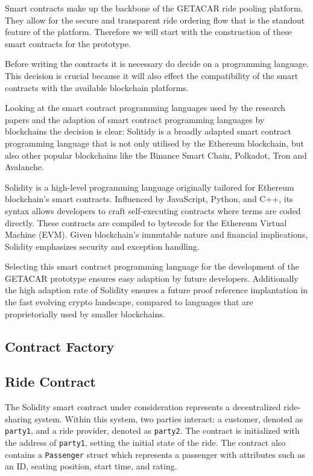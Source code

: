 Smart contracts make up the backbone of the GETACAR ride pooling platform. They allow for the secure and transparent ride ordering flow that is the standout feature of the platform. Therefore we will start with the construction of these smart contracts for the prototype. 

Before writing the contracts it is necessary do decide on a programming language. This decision is crucial because it will also effect the compatibility of the smart contracts with the available blockchain platforms. 

Looking at the smart contract programming languages used by the research papers and the adaption of smart contract programming languages by blockchains the decision is clear: Solitidy is a broadly adapted smart contract programming language that is not only utilised by the Ethereum blockchain, but also other popular blockchains like the Binance Smart Chain, Polkadot, Tron and Avalanche. 

Solidity is a high-level programming language originally tailored for Ethereum blockchain's smart contracts. Influenced by JavaScript, Python, and C++, its syntax allows developers to craft self-executing contracts where terms are coded directly. These contracts are compiled to bytecode for the Ethereum Virtual Machine (EVM). Given blockchain's immutable nature and financial implications, Solidity emphasizes security and exception handling. 

Selecting this smart contract programming language for the development of the GETACAR prototype ensures easy adaption 
by future developers. Additionally the high adaption rate of Solidity ensures a future proof reference implantation in the fast evolving crypto landscape, compared to languages that are proprietorially used by smaller blockchains. 

\subsection{Contract Factory}

\subsection{Ride Contract}


The Solidity smart contract under consideration represents a decentralized ride-sharing system. Within this system, two parties interact: a customer, denoted as \texttt{party1}, and a ride provider, denoted as \texttt{party2}. The contract is initialized with the address of \texttt{party1}, setting the initial state of the ride. The contract also contains a \texttt{Passenger} struct which represents a passenger with attributes such as an ID, seating position, start time, and rating. 

